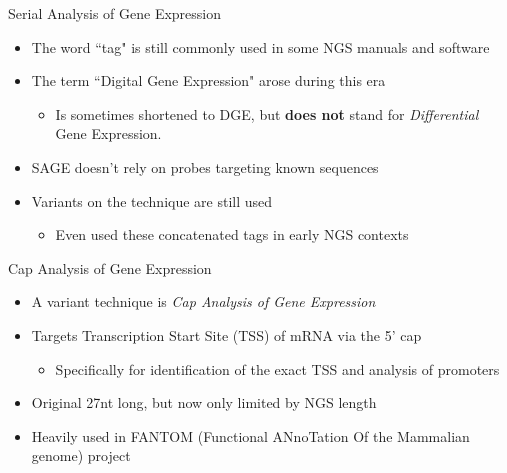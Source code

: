 \documentclass[aspectratio=169,11pt]{beamer}
\begin{document}
\begin{frame}{Serial Analysis of Gene Expression}

	\begin{itemize}
		\item The word ``tag" is still commonly used in some NGS manuals and software
		\item The term ``Digital Gene Expression" arose during this era
		\begin{itemize}
			\item Is sometimes shortened to DGE, but \textbf{does not} stand for \textit{Differential} Gene Expression.
		\end{itemize}
		\item SAGE doesn't rely on probes targeting known sequences
		\item Variants on the technique are still used
		\begin{itemize}
			\item Even used these concatenated tags in early NGS contexts
		\end{itemize}
	\end{itemize}

\end{frame}


\begin{frame}{Cap Analysis of Gene Expression}

	\begin{itemize}
		\item A variant technique is \textit{Cap Analysis of Gene Expression}
		\item Targets Transcription Start Site (TSS) of mRNA via the 5' cap
		\begin{itemize}
			\item Specifically for identification of the exact TSS and analysis of promoters
		\end{itemize}
		\item Original 27nt long, but now only limited by NGS length
		\item Heavily used in FANTOM (Functional ANnoTation Of the Mammalian genome) project
	\end{itemize}


\end{frame} 
\end{document}
